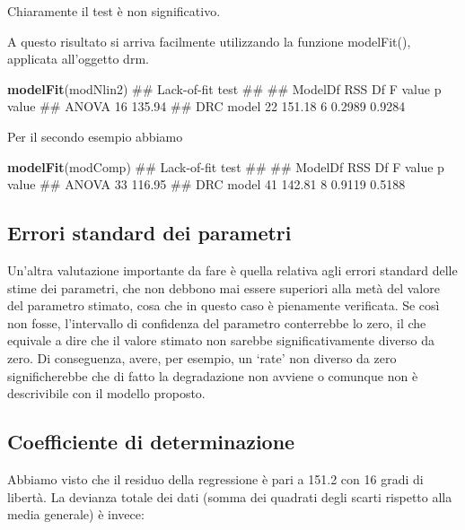 \documentclass[a4paper,12pt,oneside]{book}
\newenvironment{Shaded}{\begin{snugshade}}{\end{snugshade}}
\newcommand{\KeywordTok}[1]{\textcolor[rgb]{0.13,0.29,0.53}{\textbf{#1}}}
\newcommand{\NormalTok}[1]{#1}
\theoremstyle{definition}
\theoremstyle{definition}
\theoremstyle{definition}
\theoremstyle{remark}
\begin{document}
Chiaramente il test è non significativo.

A questo risultato si arriva facilmente utilizzando la funzione
modelFit(), applicata all'oggetto drm.

\begin{Shaded}
\begin{Highlighting}[]
\KeywordTok{modelFit}\NormalTok{(modNlin2)}
\NormalTok{## Lack-of-fit test}
\NormalTok{## }
\NormalTok{##           ModelDf    RSS Df F value p value}
\NormalTok{## ANOVA          16 135.94                   }
\NormalTok{## DRC model      22 151.18  6  0.2989  0.9284}
\end{Highlighting}
\end{Shaded}

Per il secondo esempio abbiamo

\begin{Shaded}
\begin{Highlighting}[]
\KeywordTok{modelFit}\NormalTok{(modComp)}
\NormalTok{## Lack-of-fit test}
\NormalTok{## }
\NormalTok{##           ModelDf    RSS Df F value p value}
\NormalTok{## ANOVA          33 116.95                   }
\NormalTok{## DRC model      41 142.81  8  0.9119  0.5188}
\end{Highlighting}
\end{Shaded}

\subsection{Errori standard dei
parametri}\label{errori-standard-dei-parametri-1}

Un'altra valutazione importante da fare è quella relativa agli errori
standard delle stime dei parametri, che non debbono mai essere superiori
alla metà del valore del parametro stimato, cosa che in questo caso è
pienamente verificata. Se così non fosse, l'intervallo di confidenza del
parametro conterrebbe lo zero, il che equivale a dire che il valore
stimato non sarebbe significativamente diverso da zero. Di conseguenza,
avere, per esempio, un `rate' non diverso da zero significherebbe che di
fatto la degradazione non avviene o comunque non è descrivibile con il
modello proposto.

\subsection{Coefficiente di
determinazione}\label{coefficiente-di-determinazione}

Abbiamo visto che il residuo della regressione è pari a 151.2 con 16
gradi di libertà. La devianza totale dei dati (somma dei quadrati degli
scarti rispetto alla media generale) è invece:
\end{document}
